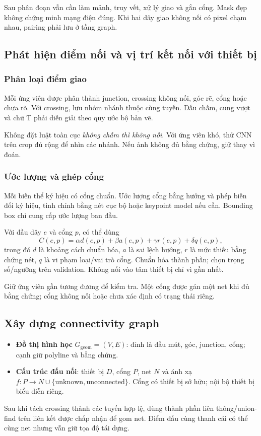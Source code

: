 \documentclass[11pt,a4paper]{article}
\newcommand{\code}[1]{\texttt{\detokenize{#1}}}
\begin{document}
Sau phân đoạn vẫn cần làm mảnh, truy vết, xử lý giao và gắn cổng. Mask đẹp không chứng minh mạng điện đúng. Khi hai dây giao không nối có pixel chạm nhau, pairing phải lưu ở tầng graph.

\subsection{Phát hiện điểm nối và vị trí kết nối với thiết bị}
\subsubsection{Phân loại điểm giao}
Mỗi ứng viên được phân thành junction, crossing không nối, góc rẽ, cổng hoặc chưa rõ. Với crossing, lưu nhóm nhánh thuộc cùng tuyến. Dấu chấm, cung vượt và chữ T phải diễn giải theo quy ước bộ bản vẽ.

Không đặt luật toàn cục \emph{không chấm thì không nối}. Với ứng viên khó, thử CNN trên crop đủ rộng để nhìn các nhánh. Nếu ảnh không đủ bằng chứng, giữ \code{unknown} thay vì đoán.

\subsubsection{Ước lượng và ghép cổng}
Mỗi biến thể ký hiệu có cổng chuẩn. Ước lượng cổng bằng hướng và phép biến đổi ký hiệu, tinh chỉnh bằng nét cục bộ hoặc keypoint model nếu cần. Bounding box chỉ cung cấp ước lượng ban đầu.

Với đầu dây $e$ và cổng $p$, có thể dùng
\begin{equation}
  C(e,p)=\alpha d(e,p)+\beta a(e,p)+\gamma r(e,p)+\delta q(e,p),
\end{equation}
trong đó $d$ là khoảng cách chuẩn hóa, $a$ là sai lệch hướng, $r$ là mức thiếu bằng chứng nét, $q$ là vi phạm loại/vai trò cổng. Chuẩn hóa thành phần; chọn trọng số/ngưỡng trên validation. Không nối vào tâm thiết bị chỉ vì gần nhất.

Giữ ứng viên gần tương đương để kiểm tra. Một cổng được gán một net khi đủ bằng chứng; cổng không nối hoặc chưa xác định có trạng thái riêng.

\subsection{Xây dựng connectivity graph}
\begin{itemize}
  \item \textbf{Đồ thị hình học} $G_{\mathrm{geom}}=(V,E)$: đỉnh là đầu mút, góc, junction, cổng; cạnh giữ polyline và bằng chứng.
  \item \textbf{Cấu trúc đấu nối}: thiết bị $D$, cổng $P$, net $N$ và ánh xạ $f:P\rightarrow N\cup\{\mathrm{unknown},\mathrm{unconnected}\}$. Cổng có thiết bị sở hữu; nội bộ thiết bị biểu diễn riêng.
\end{itemize}
Sau khi tách crossing thành các tuyến hợp lệ, dùng thành phần liên thông/union-find trên liên kết được chấp nhận để gom net. Điểm đấu cùng thanh cái có thể cùng net nhưng vẫn giữ tọa độ tái dựng.
\end{document}
